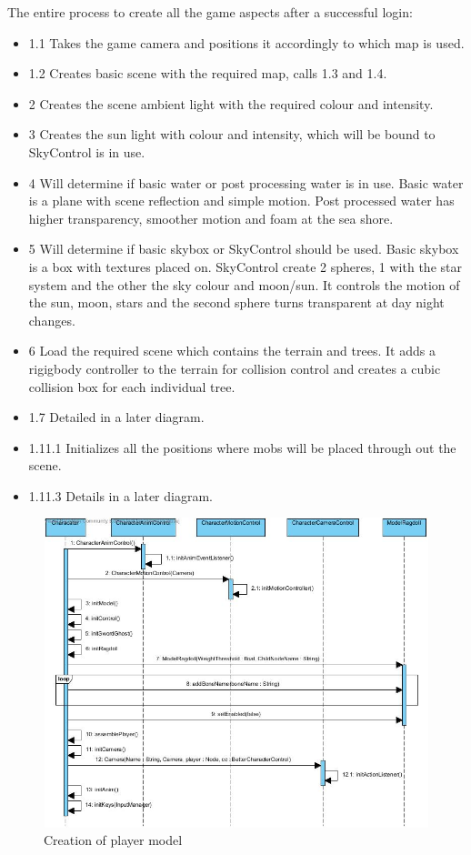\documentclass[letterpaper]{article}
\begin{document}
					The entire process to create all the game aspects after a successful login:
					\begin{itemize}
						\item 1.1 Takes the game camera and positions it accordingly to which map is used.
						\item 1.2 Creates basic scene with the required map, calls 1.3 and 1.4.
						\item 2 Creates the scene ambient light with the required colour and intensity.
						\item 3 Creates the sun light with colour and intensity, which will be bound to SkyControl is in use.
						\item 4 Will determine if basic water or post processing water is in use. Basic water is a plane with scene reflection and simple motion. Post processed water has higher transparency, smoother motion and foam at the sea shore.
						\item 5 Will determine if basic skybox or SkyControl should be used. Basic skybox is a box with textures placed on. SkyControl create 2 spheres, 1 with the star system and the other the sky colour and moon/sun. It controls the motion of the sun, moon, stars and the second sphere turns transparent at day night changes.
						\item 6 Load the required scene which contains the terrain and trees. It adds a rigigbody controller to the terrain for collision control and creates a cubic collision box for each individual tree.
						\item 1.7 Detailed in a later diagram.
						\item 1.11.1 Initializes all the positions where mobs will be placed through out the scene.
						\item 1.11.3 Details in a later diagram.
					\end{itemize}
					
					\begin{figure}[H]
					\centering
					\includegraphics[width=160mm, height=90mm]{UML_Diagram/Sequence/Player_Creation.jpg}
					\caption{Creation of player model}
					\label{overflow}
					\end{figure}
					
\end{document}

